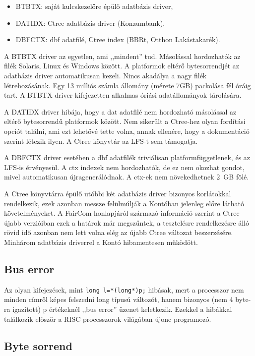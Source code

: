 \begin{itemize}
 \item  BTBTX:   saját kulcskezelőre épülő adatbázis driver,
 \item  DATIDX:  Ctree adatbázis driver (Konzumbank), 
 \item  DBFCTX:  dbf adatfilé, Ctree index (BBRt, Otthon Lakástakarék).
\end{itemize}

A BTBTX driver az egyetlen, ami ,,mindent'' tud. Másolással 
hordozhatók az filék Solaris, Linux és Windows között. A platformok
eltérő bytesorrendjét az adatbázis driver automatikusan kezeli.
Nincs akadálya a nagy filék létrehozásának. Egy 13 milliós számla
állomány (mérete 7GB) packolása fél óráig tart. A BTBTX driver
kifejezetten alkalmas óriási adatállományok tárolására.

A DATIDX driver hibája, hogy a dat adatfilé nem hordozható másolással
az eltérő bytesorrendű platformok között. Nem sikerült a Ctree-hez
olyan fordítási opciót találni, ami ezt lehetővé tette volna,
annak ellenére, hogy a dokumentáció szerint létezik ilyen.
A Ctree könyvtár az LFS-t sem támogatja.

A DBFCTX driver esetében a dbf adatfilék triviálisan platformfüggetlenek,
és az LFS-is érvényesül. A ctx indexek nem hordozhatók, de ez nem okozhat
gondot, mivel automatikusan újragenerálódnak. A ctx-ek nem növekedhetnek
2~GB fölé.

A Ctree könyvtárra épülő utóbbi két adatbázis driver bizonyos korlátokkal
rendelkezik, ezek azonban messze felülmúlják a Kontóban jelenleg előre
látható követelményeket. A FairCom honlapjáról származó információ
szerint a Ctree újabb verzióiban ezek a határok már megszűntek, a tesztelésre
rendelkezésre álló rövid idő azonban nem lett volna elég az újabb Ctree
változat beszerzésére. Minhárom adatbázis driverrel a Kontó hibamentesen 
működött.

\subsection{Bus error}

Az olyan kifejezések, mint  \verb!long l=*(long*)p;! hibásak,
mert a processzor nem minden címről képes felszedni long típusú
változót, hanem bizonyos (nem 4 byte-ra igazított) p értékeknél 
,,bus error'' üzenet keletkezik. Ezekkel a hibákkal találkozik először 
a RISC processzorok világában újonc programozó.


\subsection{Byte sorrend}

